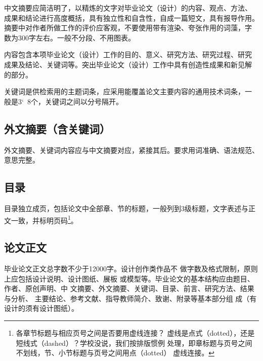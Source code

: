 中文摘要应简洁明了，以精炼的文字对毕业论文（设计）的内容、观点、方法、
成果和结论进行高度概括，具有独立性和自含性，自成一篇短文，具有报导作用。
摘要中对作者所做工作的评价应客观，不要使用带有渲染、夸张作用的词藻，字
数为300字左右。一般不分段、不用图表。

内容包含本项毕业论文（设计）工作的目的、意义、研究方法、研究过程、研究
成果及结论、关键词等。突出毕业论文（设计）工作中具有创造性成果和新见解
的部分。

关键词是供检索用的主题词条，应采用能覆盖论文主要内容的通用技术词条，一
般是3\char`~8个，关键词之间以分号隔开。

\subsection{外文摘要（含关键词）}

外文摘要、关键词内容应与中文摘要对应，紧接其后。要求用词准确、语法规范、
意思完整。

\subsection{目录}

目录独立成页，包括论文中全部章、节的标题，一般列到3级标题，文字表述与正
文一致，并标明页码\footnote{各章节标题与相应页号之间是否要用虚线连接？
  虚线是点式（dotted），还是短线式（dashed）？学校没说，我们按排版惯例
  处理，即章标题与页号之间不划线，节、小节标题与页号之间用点（dotted）
  虚线连接。}。

\subsection{论文正文}

毕业论文正文总字数不少于12000字。设计创作类作品不
做字数及格式限制，原则上应包括设计说明、设计图纸、展板
或模型等。毕业论文的基本结构应由题目、作者、原创声明、中
文摘要、外文摘要、关键词、目录、前言、研究方法、结果与分析、
主要结论、参考文献、指导教师简介、致谢、附录等基本部分组
成（有设计的须有设计图纸）。

